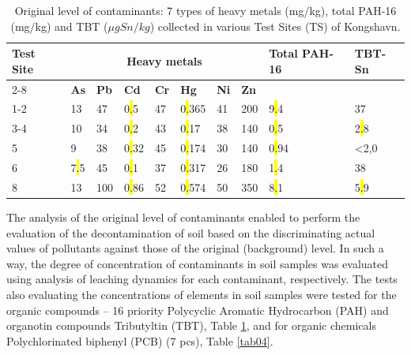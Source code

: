 \documentclass[algorithms,article,submit,pdftex,moreauthors]{Definitions/mdpi}
\begin{document}
\begin{table}[H] 
\setcellgapes{1pt}
\makegapedcells
\caption{Original level of contaminants: 7 types of heavy metals (mg/kg), total PAH-16 (mg/kg) and TBT ($\mu g Sn/kg$) collected in various Test Sites (TS) of Kongshavn.\label{tab03}}
\begin{tabularx}{\textwidth}{p{1.2cm} p{0.8cm} p{0.8cm} p{0.8cm}p{0.8cm}p{0.8cm}p{0.8cm}p{0.8cm}p{2.0cm}p{1.2cm}}
\toprule
\multirow{2}{*}{\textbf{Test Site}} & \multicolumn{7}{c}{\textbf{Heavy metals}} & \multirow{2}{*}{\textbf{Total PAH-16}} & \multirow{2}{*}{\textbf{TBT-Sn}}\\ \cline{2-8}
& \textbf{As} & \textbf{Pb} & \textbf{Cd} & \textbf{Cr} & \textbf{Hg} & \textbf{Ni} & \textbf{Zn} & & \\
\midrule
	1-2 	& 13	& 47 & 0\hl{.}5 & 47 & 0\hl{.}365 & 41 & 200 & 9\hl{.}4 & 37 \\
	3-4 & 10	& 34 & 0\hl{.}2 & 43 & 0\hl{.}17 & 38 & 140 & 0\hl{.}5 & 2\hl{.}8 \\
	5 &    9	& 38 & 0\hl{.}32 & 45 & 0\hl{.}174 & 30 & 140 & 0\hl{.}94 & <2,0 \\
	6 &   7\hl{.}5	& 45 & 0\hl{.}1 & 37 & 0\hl{.}317 & 26 & 180 & 1\hl{.}4 & 38 \\
	8 &   13	& 100 & 0\hl{.}86 & 52 & 0\hl{.}574 & 50 & 350 & 8\hl{.}1 & 5\hl{.}9 \\
\bottomrule
\end{tabularx}
\end{table}

The analysis of the original level of contaminants enabled to perform the evaluation of the decontamination of soil based on the discriminating actual values of pollutants against those of the original (background) level. In such a way, the degree of concentration of contaminants in soil samples was evaluated using analysis of leaching dynamics for each contaminant, respectively. The tests also evaluating the concentrations of elements in soil samples were tested for the organic compounds -- 16 priority Polycyclic Aromatic Hydrocarbon (PAH) and organotin compounds Tributyltin (TBT), Table \ref{tab03}, and for organic chemicals Polychlorinated biphenyl (PCB) (7 pcs), Table \ref{tab04}.
\end{document}
